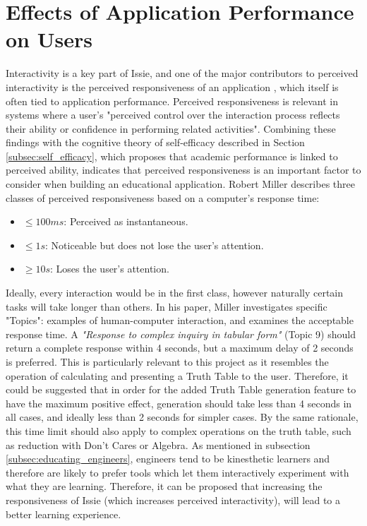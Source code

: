 \section{Effects of Application Performance on Users} \label{sec:perfeffects}
Interactivity is a key part of Issie, and one of the major contributors to perceived interactivity is the perceived responsiveness of an application \cite{interactiveWu}, which itself is often tied to application performance. Perceived responsiveness is relevant in systems where a user's "perceived control over the interaction process reflects their ability or confidence in performing related activities". Combining these findings with the cognitive theory of self-efficacy described in Section \ref{subsec:self_efficacy}, which proposes that academic performance is linked to perceived ability, indicates that perceived responsiveness is an important factor to consider when building an educational application. Robert Miller \cite{Miller1968ResponseTI} describes three classes of perceived responsiveness based on a computer's response time:
\begin{itemize}
    \item $\leq 100ms$: Perceived as instantaneous.
    \item $\leq 1s$: Noticeable but does not lose the user's attention.
    \item $\geq 10s$: Loses the user's attention.
\end{itemize}

Ideally, every interaction would be in the first class, however naturally certain tasks will take longer than others. In his paper, Miller investigates specific "Topics": examples of human-computer interaction, and examines the acceptable response time. A \textit{"Response to complex inquiry in tabular form"} (Topic 9) should return a complete response within 4 seconds, but a maximum delay of 2 seconds is preferred. This is particularly relevant to this project as it resembles the operation of calculating and presenting a Truth Table to the user. Therefore, it could be suggested that in order for the added Truth Table generation feature to have the maximum positive effect, generation should take less than 4 seconds in all cases, and ideally less than 2 seconds for simpler cases. By the same rationale, this time limit should also apply to complex operations on the truth table, such as reduction with Don't Cares or Algebra.
As mentioned in subsection \ref{subsec:educating_engineers}, engineers tend to be kinesthetic learners and therefore are likely to prefer tools which let them interactively experiment with what they are learning. Therefore, it can be proposed that increasing the responsiveness of Issie (which increases perceived interactivity), will lead to a better learning experience. 


